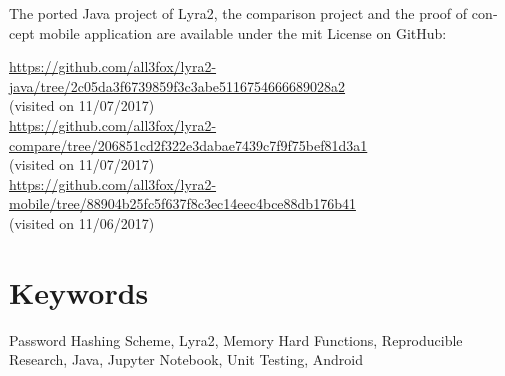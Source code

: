 \begin{otherlanguage}{english}
The ported Java project of Lyra2, the comparison project and the proof of concept mobile application are available under the \gls{mit} License on GitHub:

\url{https://github.com/all3fox/lyra2-java/tree/2c05da3f6739859f3c3abe5116754666689028a2}
\\(visited on 11/07/2017)\\
\url{https://github.com/all3fox/lyra2-compare/tree/206851cd2f322e3dabae7439c7f9f75bef81d3a1}
\\(visited on 11/07/2017)\\
\url{https://github.com/all3fox/lyra2-mobile/tree/88904b25fc5f637f8c3ec14eec4bce88db176b41}
\\(visited on 11/06/2017)

\bigskip

\section*{Keywords}
Password Hashing Scheme, Lyra2, Memory Hard Functions, Reproducible Research, Java, Jupyter Notebook, Unit Testing, Android

\end{otherlanguage}
